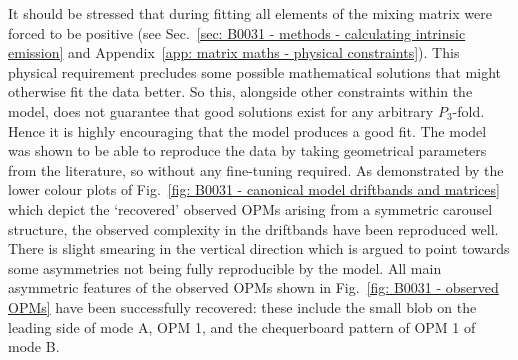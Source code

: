 
It should be stressed that during fitting all elements of the mixing matrix were forced to be positive (see Sec.~\ref{sec: B0031 - methods - calculating intrinsic emission} and Appendix~\ref{app: matrix maths - physical constraints}). This physical requirement precludes some possible mathematical solutions that might otherwise fit the data better. So this, alongside other constraints within the model, does not guarantee that good solutions exist for any arbitrary $P_3$-fold. Hence it is highly encouraging that the model produces a good fit. The model was shown to be able to reproduce the data by taking geometrical parameters from the literature, so without any fine-tuning required. As demonstrated by the lower colour plots of Fig.~\ref{fig: B0031 - canonical model driftbands and matrices} which depict the `recovered' observed OPMs arising from a symmetric carousel structure, the observed complexity in the driftbands have been reproduced well. There is slight smearing in the vertical direction which is argued to point towards some asymmetries not being fully reproducible by the model. All main asymmetric features of the observed OPMs shown in Fig.~\ref{fig: B0031 - observed OPMs} have been successfully recovered: these include the small blob on the leading side of mode A, OPM 1, and the chequerboard pattern of OPM 1 of mode B. 

